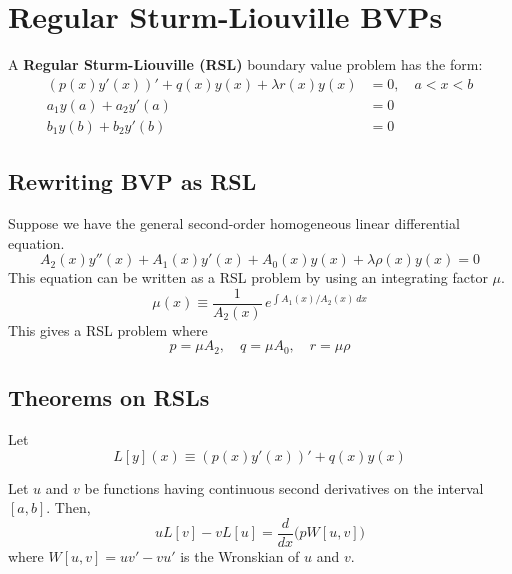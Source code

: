 \section{Regular Sturm-Liouville BVPs}
A \textbf{Regular Sturm-Liouville (RSL)} boundary value problem has the form:
\begin{align} \label{eq:RSL-general}
    (p(x)y'(x))' + q(x)y(x) + \lambda r(x)y(x) & = 0, \quad a < x < b \\
    a_1 y(a) + a_2 y'(a) & = 0 \\
    b_1 y(b) + b_2 y'(b) & = 0 
\end{align}


\subsection{Rewriting BVP as RSL}
Suppose we have the general second-order homogeneous linear differential equation.
\begin{equation} \label{eq:general-solode}
    A_2(x)y''(x) + A_1(x)y'(x) + A_0(x)y(x) + \lambda \rho(x)y(x) = 0
\end{equation}
This equation can be written as a RSL problem by using an integrating factor $\mu$.
\begin{equation}\label{eq:RSL-integratingfactor}
    \mu(x) \equiv \frac{1}{A_2(x)}\, e^{\int A_1(x)/A_2(x)\,dx}
\end{equation}
This gives a RSL problem where
\begin{equation}
    p=\mu A_2,\quad q=\mu A_0,\quad r=\mu\rho
\end{equation}


\subsection{Theorems on RSLs}
Let
\begin{equation}\label{eq:RSL-operator}
    L[y](x) \equiv  (p(x)y'(x))' + q(x)y(x)
\end{equation}

\begin{theorem}
Let $u$ and $v$ be functions having continuous second derivatives on the interval $[a,b]$. Then,
\begin{equation}
    uL[v] - vL[u] = \frac{d}{dx} \Big(pW[u,v]\Big)
\end{equation}
where $W[u,v]=uv'-vu'$ is the Wronskian of $u$ and $v$.
\end{theorem}

